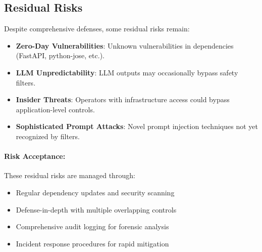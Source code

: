 \subsection{Residual Risks}
\label{subsec:residual-risks}

Despite comprehensive defenses, some residual risks remain:

\begin{itemize}
    \item \textbf{Zero-Day Vulnerabilities}: Unknown vulnerabilities in dependencies (FastAPI, python-jose, etc.).
    \item \textbf{LLM Unpredictability}: LLM outputs may occasionally bypass safety filters.
    \item \textbf{Insider Threats}: Operators with infrastructure access could bypass application-level controls.
    \item \textbf{Sophisticated Prompt Attacks}: Novel prompt injection techniques not yet recognized by filters.
\end{itemize}

\paragraph{Risk Acceptance:} These residual risks are managed through:
\begin{itemize}
    \item Regular dependency updates and security scanning
    \item Defense-in-depth with multiple overlapping controls
    \item Comprehensive audit logging for forensic analysis
    \item Incident response procedures for rapid mitigation
\end{itemize}

